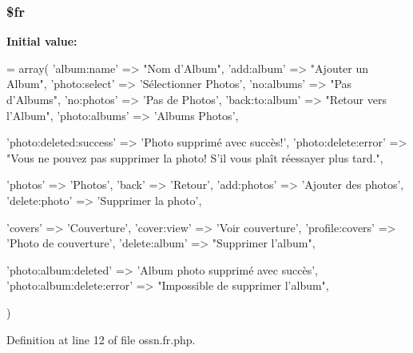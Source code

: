 \subsubsection[{\texorpdfstring{\$fr}{$fr}}]{\setlength{\rightskip}{0pt plus 5cm}\$fr}\hypertarget{components_2_ossn_photos_2locale_2ossn_8fr_8php_ad5107c697816e7b7f89ad1b3e94e3e0e}{}\label{components_2_ossn_photos_2locale_2ossn_8fr_8php_ad5107c697816e7b7f89ad1b3e94e3e0e}
{\bfseries Initial value\+:}
\begin{DoxyCode}
= array(
    \textcolor{stringliteral}{'album:name'} => \textcolor{stringliteral}{"Nom d'Album"},
    \textcolor{stringliteral}{'add:album'} => \textcolor{stringliteral}{"Ajouter un Album"},
    \textcolor{stringliteral}{'photo:select'} => \textcolor{stringliteral}{'Sélectionner Photos'},
    \textcolor{stringliteral}{'no:albums'} => \textcolor{stringliteral}{"Pas d'Albums"},
    \textcolor{stringliteral}{'no:photos'} => \textcolor{stringliteral}{'Pas de Photos'},
    \textcolor{stringliteral}{'back:to:album'} => \textcolor{stringliteral}{"Retour vers l'Album"},
    \textcolor{stringliteral}{'photo:albums'} => \textcolor{stringliteral}{'Albums Photos'},
    
    \textcolor{stringliteral}{'photo:deleted:success'} => \textcolor{stringliteral}{'Photo supprimé avec succès!'},
    \textcolor{stringliteral}{'photo:delete:error'} => \textcolor{stringliteral}{"Vous ne pouvez pas supprimer la photo! S'il vous plaît réessayer plus tard."},
    
    \textcolor{stringliteral}{'photos'} => \textcolor{stringliteral}{'Photos'},
    \textcolor{stringliteral}{'back'} => \textcolor{stringliteral}{'Retour'},
    \textcolor{stringliteral}{'add:photos'} => \textcolor{stringliteral}{'Ajouter des photos'},
    \textcolor{stringliteral}{'delete:photo'} => \textcolor{stringliteral}{'Supprimer la photo'},
    
    \textcolor{stringliteral}{'covers'} => \textcolor{stringliteral}{'Couverture'},
    \textcolor{stringliteral}{'cover:view'} => \textcolor{stringliteral}{'Voir couverture'},
    \textcolor{stringliteral}{'profile:covers'} => \textcolor{stringliteral}{'Photo de couverture'},
    \textcolor{stringliteral}{'delete:album'} => \textcolor{stringliteral}{"Supprimer l'album"},
    
    \textcolor{stringliteral}{'photo:album:deleted'} => \textcolor{stringliteral}{'Album photo supprimé avec succès'},
    \textcolor{stringliteral}{'photo:album:delete:error'} => \textcolor{stringliteral}{"Impossible de supprimer l'album"},    

    
)
\end{DoxyCode}


Definition at line 12 of file ossn.\+fr.\+php.

